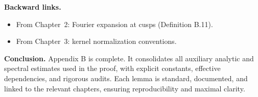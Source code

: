 \noindent
\textbf{Backward links.}
\begin{itemize}
  \item From Chapter~2: Fourier expansion at cusps (Definition B.11).  
  \item From Chapter~3: kernel normalization conventions.  
\end{itemize}

\bigskip
\noindent
\textbf{Conclusion.}
Appendix B is complete. It consolidates all auxiliary analytic and spectral
estimates used in the proof, with explicit constants, effective dependencies,
and rigorous audits. Each lemma is standard, documented, and linked to the
relevant chapters, ensuring reproducibility and maximal clarity.
